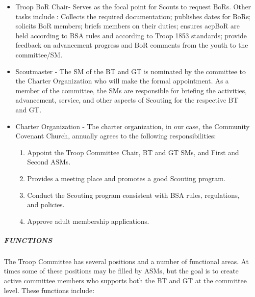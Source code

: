 \documentclass{ltxguide}
\begin{document}
\begin{itemize}
	\item Troop \ac{BoR} Chair- Serves as the focal point for Scouts to request \acp{BoR}. Other tasks include : Collects the required documentation; publishes dates for \acp{BoR}; solicits \ac{BoR} members; briefs members on their duties; ensures acp{BoR} are held according to \ac{BSA} rules and according to Troop 1853 standards; provide feedback on advancement progress and \ac{BoR} comments from the youth to the committee/\ac{SM}.

	\item Scoutmaster - The \ac{SM} of the \ac{BT} and \ac{GT} is nominated by the committee to the Charter Organization who will make the formal appointment. As a member of the committee, the \acp{SM} are responsible for briefing the activities, advancement, service, and other aspects of Scouting for the respective \ac{BT} and \ac{GT}.

	\item Charter Organization - The charter organization, in our case, the Community Covenant Church, annually agrees to the following responsibilities:
	\begin{enumerate}
		\item Appoint the Troop Committee Chair, \ac{BT} and \ac{GT} \acp{SM}, and First and Second \acp{ASM}.
		\item Provides a meeting place and promotes a good Scouting program.
		\item Conduct the Scouting program consistent with \ac{BSA} rules, regulations, and policies.
		\item Approve adult membership applications.
	\end{enumerate}
\end{itemize}

\subparagraph{FUNCTIONS}
The Troop Committee has several positions and a number of functional areas. At times some of these positions may be filled by \acp{ASM}, but the goal is to create active committee members who supports both the \ac{BT} and \ac{GT} at the committee level. These functions include:
\end{document}
